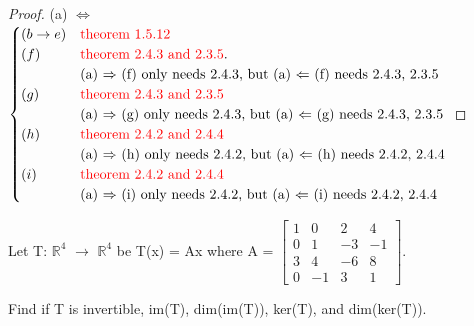     \begin{proof}
        \footnotesize
        (a) $\Leftrightarrow$
        $\begin{cases}
            (b \rightarrow e) & {\color{red} \text{theorem 1.5.12}} \\
            (f) & {\color{red} \text{theorem 2.4.3 and 2.3.5}}. \\
                & \text{(a) $\Rightarrow$ (f) only needs 2.4.3,
                    but (a) $\Leftarrow$ (f) needs 2.4.3, 2.3.5} \\
            (g) & {\color{red} \text{theorem 2.4.3 and 2.3.5}} \\
                & \text{(a) $\Rightarrow$ (g) only needs 2.4.3,
                    but (a) $\Leftarrow$ (g) needs 2.4.3, 2.3.5} \\
            (h) & {\color{red} \text{theorem 2.4.2 and 2.4.4}} \\
                & \text{(a) $\Rightarrow$ (h) only needs 2.4.2,
                    but (a) $\Leftarrow$ (h) needs 2.4.2, 2.4.4} \\
            (i) & {\color{red} \text{theorem 2.4.2 and 2.4.4}} \\
                & \text{(a) $\Rightarrow$ (i) only needs 2.4.2,
                    but (a) $\Leftarrow$ (i) needs 2.4.2, 2.4.4} \\
        \end{cases}$
        \normalsize
    \end{proof}

    \vspace{0.5cm}



    \begin{example}
        Let T: $\mathbb{R}^4$ $\rightarrow$ $\mathbb{R}^4$
        be T(x) = Ax where A =
        \scriptsize
        $\begin{bmatrix}
            1 & 0 & 2 & 4 \\
            0 & 1 & -3 & -1 \\
            3 & 4 & -6 & 8 \\
            0 & -1 & 3 & 1
        \end{bmatrix}$.
        \normalsize

        Find if T is invertible, im(T), dim(im(T)), ker(T), and dim(ker(T)).
    \end{example}


